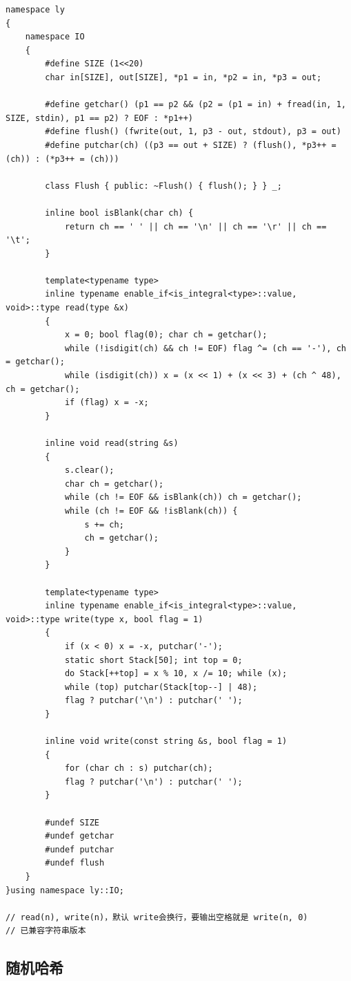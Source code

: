 \documentclass[11pt,a4paper]{ctexart}
\begin{document}
\begin{lstlisting}
namespace ly
{
    namespace IO
    {
        #define SIZE (1<<20)
        char in[SIZE], out[SIZE], *p1 = in, *p2 = in, *p3 = out;
        
        #define getchar() (p1 == p2 && (p2 = (p1 = in) + fread(in, 1, SIZE, stdin), p1 == p2) ? EOF : *p1++)
        #define flush() (fwrite(out, 1, p3 - out, stdout), p3 = out)
        #define putchar(ch) ((p3 == out + SIZE) ? (flush(), *p3++ = (ch)) : (*p3++ = (ch)))
        
        class Flush { public: ~Flush() { flush(); } } _;

        inline bool isBlank(char ch) {
            return ch == ' ' || ch == '\n' || ch == '\r' || ch == '\t';
        }

        template<typename type>
        inline typename enable_if<is_integral<type>::value, void>::type read(type &x)
        {
            x = 0; bool flag(0); char ch = getchar();
            while (!isdigit(ch) && ch != EOF) flag ^= (ch == '-'), ch = getchar();
            while (isdigit(ch)) x = (x << 1) + (x << 3) + (ch ^ 48), ch = getchar();
            if (flag) x = -x;
        }

        inline void read(string &s)
        {
            s.clear();
            char ch = getchar();
            while (ch != EOF && isBlank(ch)) ch = getchar();
            while (ch != EOF && !isBlank(ch)) {
                s += ch;
                ch = getchar();
            }
        }

        template<typename type>
        inline typename enable_if<is_integral<type>::value, void>::type write(type x, bool flag = 1)
        {
            if (x < 0) x = -x, putchar('-');
            static short Stack[50]; int top = 0;
            do Stack[++top] = x % 10, x /= 10; while (x);
            while (top) putchar(Stack[top--] | 48);
            flag ? putchar('\n') : putchar(' ');
        }

        inline void write(const string &s, bool flag = 1)
        {
            for (char ch : s) putchar(ch);
            flag ? putchar('\n') : putchar(' ');
        }

        #undef SIZE
        #undef getchar
        #undef putchar
        #undef flush
    }
}using namespace ly::IO;

// read(n), write(n)，默认 write会换行，要输出空格就是 write(n, 0)
// 已兼容字符串版本
\end{lstlisting}

\subsection{随机哈希}
\end{document}
